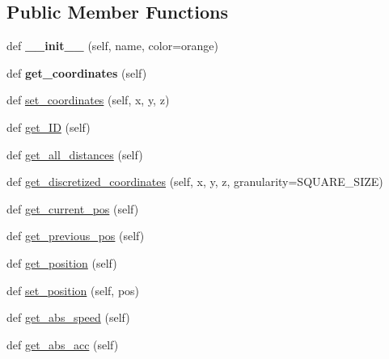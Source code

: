 \subsection*{Public Member Functions}
\begin{DoxyCompactItemize}
\item 
\mbox{\label{classmovingentity_1_1_moving_entity_a12b1c3f794a44ea527a3eafe82e0f8e8}} 
def {\bfseries \+\_\+\+\_\+init\+\_\+\+\_\+} (self, name, color=\textquotesingle{}orange\textquotesingle{})
\item 
\mbox{\label{classmovingentity_1_1_moving_entity_a89c968c83617e2fca6e64e74c6478b58}} 
def {\bfseries get\+\_\+coordinates} (self)
\item 
def \mbox{\hyperlink{classmovingentity_1_1_moving_entity_afc59fd77ac0d0375226e77947f7f6624}{set\+\_\+coordinates}} (self, x, y, z)
\item 
def \mbox{\hyperlink{classmovingentity_1_1_moving_entity_a09f3f97175c16ea6025da871f653d416}{get\+\_\+\+ID}} (self)
\item 
def \mbox{\hyperlink{classmovingentity_1_1_moving_entity_a8497086c897585b6ee2234e8728e69e5}{get\+\_\+all\+\_\+distances}} (self)
\item 
def \mbox{\hyperlink{classmovingentity_1_1_moving_entity_a5b39ecfe3f50dcace4ea880ef22db24d}{get\+\_\+discretized\+\_\+coordinates}} (self, x, y, z, granularity=S\+Q\+U\+A\+R\+E\+\_\+\+S\+I\+ZE)
\item 
def \mbox{\hyperlink{classmovingentity_1_1_moving_entity_a2d32bac446feb8ad06df10e2af16f595}{get\+\_\+current\+\_\+pos}} (self)
\item 
def \mbox{\hyperlink{classmovingentity_1_1_moving_entity_a601e216b9aab14b2fb91b50b3af9db2d}{get\+\_\+previous\+\_\+pos}} (self)
\item 
def \mbox{\hyperlink{classmovingentity_1_1_moving_entity_a17e5bc839e5dae9b73b8454fed5c216c}{get\+\_\+position}} (self)
\item 
def \mbox{\hyperlink{classmovingentity_1_1_moving_entity_a8c0cf2c98dee238d1694be0a9ac45d1c}{set\+\_\+position}} (self, pos)
\item 
def \mbox{\hyperlink{classmovingentity_1_1_moving_entity_a822153dd41281662677b57fb6dbdb0a0}{get\+\_\+abs\+\_\+speed}} (self)
\item 
def \mbox{\hyperlink{classmovingentity_1_1_moving_entity_a6bad37eefcaed99163217d58444c2624}{get\+\_\+abs\+\_\+acc}} (self)

\end{DoxyCompactItemize}
